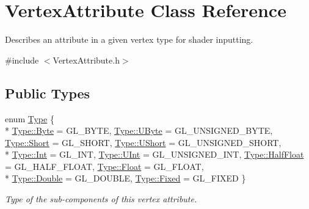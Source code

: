 \hypertarget{class_vertex_attribute}{}\section{Vertex\+Attribute Class Reference}
\label{class_vertex_attribute}


Describes an attribute in a given vertex type for shader inputting.  




{\ttfamily \#include $<$Vertex\+Attribute.\+h$>$}

\subsection*{Public Types}
\begin{DoxyCompactItemize}
\item 
enum \hyperlink{class_vertex_attribute_abe7f703a33ec0d67ecd975c08dc33f9b}{Type} \{ \\*
\hyperlink{class_vertex_attribute_abe7f703a33ec0d67ecd975c08dc33f9baa245c3230debe5c956484ecc6fa93877}{Type\+::\+Byte} = G\+L\+\_\+\+B\+Y\+TE, 
\hyperlink{class_vertex_attribute_abe7f703a33ec0d67ecd975c08dc33f9ba4b4ba765b750d5836bfeb2213cc3caea}{Type\+::\+U\+Byte} = G\+L\+\_\+\+U\+N\+S\+I\+G\+N\+E\+D\+\_\+\+B\+Y\+TE, 
\hyperlink{class_vertex_attribute_abe7f703a33ec0d67ecd975c08dc33f9ba30bb747c98bccdd11b3f89e644c4d0ad}{Type\+::\+Short} = G\+L\+\_\+\+S\+H\+O\+RT, 
\hyperlink{class_vertex_attribute_abe7f703a33ec0d67ecd975c08dc33f9badfe785f133347f9b473f99009732b1bc}{Type\+::\+U\+Short} = G\+L\+\_\+\+U\+N\+S\+I\+G\+N\+E\+D\+\_\+\+S\+H\+O\+RT, 
\\*
\hyperlink{class_vertex_attribute_abe7f703a33ec0d67ecd975c08dc33f9ba1686a6c336b71b36d77354cea19a8b52}{Type\+::\+Int} = G\+L\+\_\+\+I\+NT, 
\hyperlink{class_vertex_attribute_abe7f703a33ec0d67ecd975c08dc33f9ba0b1291eded63143ac04709711274785a}{Type\+::\+U\+Int} = G\+L\+\_\+\+U\+N\+S\+I\+G\+N\+E\+D\+\_\+\+I\+NT, 
\hyperlink{class_vertex_attribute_abe7f703a33ec0d67ecd975c08dc33f9bad35523d81610cee8b87cdac1853ad51f}{Type\+::\+Half\+Float} = G\+L\+\_\+\+H\+A\+L\+F\+\_\+\+F\+L\+O\+AT, 
\hyperlink{class_vertex_attribute_abe7f703a33ec0d67ecd975c08dc33f9ba22ae0e2b89e5e3d477f988cc36d3272b}{Type\+::\+Float} = G\+L\+\_\+\+F\+L\+O\+AT, 
\\*
\hyperlink{class_vertex_attribute_abe7f703a33ec0d67ecd975c08dc33f9bad909d38d705ce75386dd86e611a82f5b}{Type\+::\+Double} = G\+L\+\_\+\+D\+O\+U\+B\+LE, 
\hyperlink{class_vertex_attribute_abe7f703a33ec0d67ecd975c08dc33f9ba4457d440870ad6d42bab9082d9bf9b61}{Type\+::\+Fixed} = G\+L\+\_\+\+F\+I\+X\+ED
 \}\begin{DoxyCompactList}\small\item\em Type of the sub-\/components of this vertex attribute. \end{DoxyCompactList}
\end{DoxyCompactItemize}
